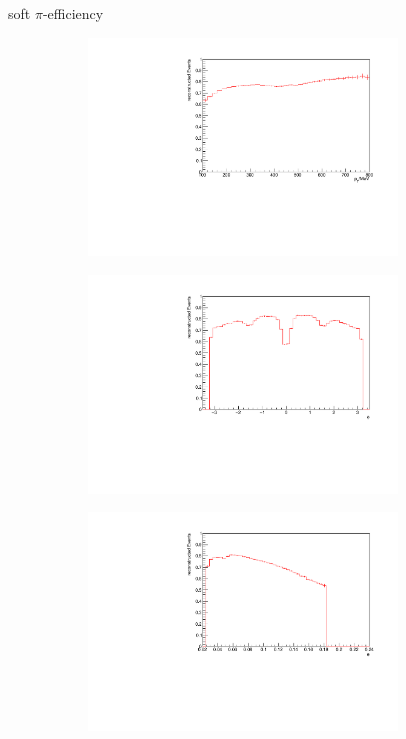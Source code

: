 \documentclass[11pt]{beamer}
\begin{document}
\begin{frame}{soft $\pi$-efficiency}
\begin{figure}
\begin{subfigure}{0.45\textwidth}
\includegraphics[width=0.9\textwidth]{up_pdf/single/pos/h_pt_reco_SPi_pos.pdf}
\end{subfigure}
\begin{subfigure}{0.45\textwidth}
\includegraphics[width=0.9\textwidth]{up_pdf/single/pos/h_phi_reco_SPi_pos.pdf}
\end{subfigure}
\begin{subfigure}{0.45\textwidth}
\includegraphics[width=0.9\textwidth]{up_pdf/single/pos/h_theta_reco_SPi_pos.pdf}

\end{subfigure}
\end{figure}
\end{frame}
\end{document}
